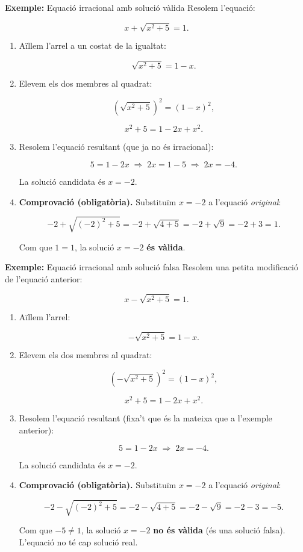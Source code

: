 \begin{exemple}{\textbf{Exemple:} Equació irracional amb solució vàlida}
Resolem l'equació:

\[
x + \sqrt{x^2+5} = 1.
\]

\begin{enumerate}
\item Aïllem l'arrel a un costat de la igualtat:

\[
\sqrt{x^2+5} = 1-x.
\]
\item Elevem els dos membres al quadrat:

\[
\left( \sqrt{x^2+5} \right)^2 = (1-x)^2,
\]

\[
x^2+5 = 1 - 2x + x^2.
\]
\item Resolem l'equació resultant (que ja no és irracional):

\[
5 = 1 - 2x \;\Rightarrow\; 2x = 1 - 5 \;\Rightarrow\; 2x = -4.
\]

La solució candidata és $x = -2$.
\item \textbf{Comprovació (obligatòria).} Substituïm $x=-2$ a l'equació \emph{original}:

\[
-2 + \sqrt{(-2)^2 + 5} = -2 + \sqrt{4 + 5} = -2 + \sqrt{9} = -2 + 3 = 1.
\]

Com que $1=1$, la solució $x=-2$ \textbf{és vàlida}.
\end{enumerate}
\end{exemple}

\begin{exemple}{\textbf{Exemple:} Equació irracional amb solució falsa}
Resolem una petita modificació de l'equació anterior:

\[
x - \sqrt{x^2+5} = 1.
\]

\begin{enumerate}
\item Aïllem l'arrel:

\[
-\sqrt{x^2+5} = 1-x.
\]
\item Elevem els dos membres al quadrat:

\[
\left( -\sqrt{x^2+5} \right)^2 = (1-x)^2,
\]

\[
x^2+5 = 1 - 2x + x^2.
\]
\item Resolem l'equació resultant (fixa't que és la mateixa que a l'exemple anterior):

\[
5 = 1 - 2x \;\Rightarrow\; 2x = -4.
\]

La solució candidata és $x = -2$.
\item \textbf{Comprovació (obligatòria).} Substituïm $x=-2$ a l'equació \emph{original}:

\[
-2 - \sqrt{(-2)^2 + 5} = -2 - \sqrt{4 + 5} = -2 - \sqrt{9} = -2 - 3 = -5.
\]

Com que $-5 \neq 1$, la solució $x=-2$ \textbf{no és vàlida} (és una solució falsa). L'equació no té cap solució real.
\end{enumerate}
\end{exemple}


